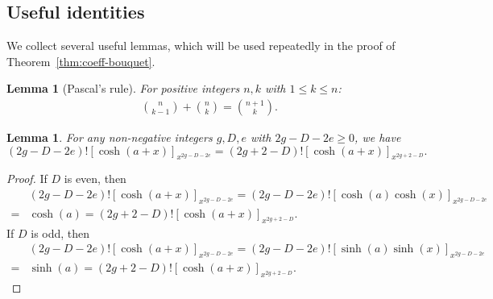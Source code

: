 \documentclass[12pt,reqno]{amsart}
\theoremstyle{plain}
\newtheorem{lemma}[theorem]{Lemma}
\theoremstyle{definition}
\theoremstyle{remark}
\begin{document}
\subsection{Useful identities}

We collect several useful lemmas, which will be used repeatedly in the proof of Theorem~\ref{thm:coeff-bouquet}.
\begin{lemma}[Pascal's rule]\label{lem:Pascal-rule}For positive integers $n,k$
 with $1\leq k\leq n$:
\begin{align*}
\binom{n}{k-1}+\binom{n}{k}=\binom{n+1}{k}.    
\end{align*}
\end{lemma}

\begin{lemma}\label{lem:cosh-e-indep}For any non-negative integers $g,D,e$ with 
$2g - D - 2e \geq 0$, we have \begin{equation*}
    (2g - D - 2e)! \left[\cosh(a + x)\right]_{x^{2g - D - 2e}}
    = (2g + 2 - D)! \left[\cosh(a + x)\right]_{x^{2g + 2 - D}}.
  \end{equation*}
\end{lemma}
\begin{proof}
  If $D$ is even, then
  \begin{align*}
    &(2g - D - 2e)! \left[\cosh(a + x)\right]_{x^{2g - D - 2e}} = (2g - D - 2e)! \left[\cosh(a) \cosh(x)\right]_{x^{2g - D - 2e}} \\
    = &\cosh(a) =(2g + 2 - D)! \left[\cosh(a + x)\right]_{x^{2g + 2 - D}}.
  \end{align*}
If $D$ is odd, then
  \begin{align*}
    &(2g - D - 2e)! \left[\cosh(a + x)\right]_{x^{2g - D - 2e}} = (2g - D - 2e)! \left[\sinh(a) \sinh(x)\right]_{x^{2g - D - 2e}} \\
    = &\sinh(a) =(2g + 2 - D)! \left[\cosh(a + x)\right]_{x^{2g + 2 - D}}.
  \end{align*}
\end{proof}
\end{document}
